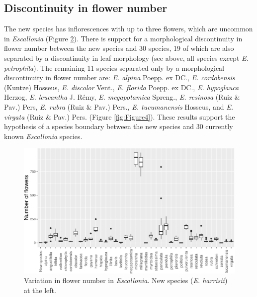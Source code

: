 \documentclass[fleqn,10pt,lineno]{wlpeerj} %
\begin{document}
\begin{figure}[ht]
\label{fig:Figure2}
\end{figure}

\subsection*{Discontinuity in flower number}

The new species has inflorescences with up to three flowers, which are uncommon in \emph{Escallonia} (Figure \ref{fig:Figure3}). There is support for a morphological discontinuity in flower number between the new species and 30 species, 19 of which are also separated by a discontinuity in leaf morphology (see above, all species except \emph{E. petrophila}). The remaining 11 species separated only by a morphological discontinuity in flower number are: \emph{E. alpina} Poepp. ex DC., \emph{E. cordobensis} (Kuntze) Hosseus, \emph{E. discolor} Vent., \emph{E. florida} Poepp. ex DC., \emph{E. hypoglauca} Herzog, \emph{E. leucantha} J. Rémy, \emph{E. megapotamica} Spreng., \emph{E. resinosa} (Ruiz \& Pav.) Pers, \emph{E. rubra} (Ruiz \& Pav.) Pers., \emph{E. tucumanensis} Hosseus, and \emph{E. virgata} (Ruiz \& Pav.) Pers. (Figure \ref{fig:Figure4}). These results support the hypothesis of a species boundary between the new species and 30 currently known \emph{Escallonia} species.

\begin{figure}[ht]
\centering
\includegraphics[width=\linewidth]{Figure3}
\caption{Variation in flower number in \emph{Escallonia}. New species (\emph{E. harrisii}) at the left.}
\label{fig:Figure3}
\end{figure}
\end{document}
